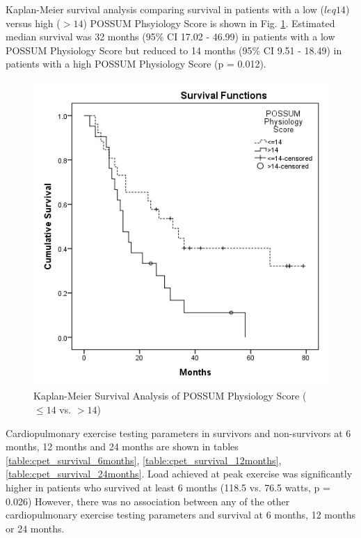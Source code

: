 Kaplan-Meier survival analysis comparing survival in patients with a low ($leq14$) versus high ($>14$) POSSUM Phsyiology Score is shown in Fig. \ref{fig:cpet_survival_km_possum}. Estimated median survival was  32 months (95\% CI 17.02 - 46.99) in patients with a low POSSUM Physiology Score but reduced to 14 months (95\% CI 9.51 - 18.49) in patients with a high POSSUM Physiology Score (p = 0.012).

\begin{figure}[htbp]
	\centering
	\includegraphics[width=0.8\linewidth]{Figures/cpet_survival_km_possum}
	\caption{Kaplan-Meier Survival Analysis of POSSUM Physiology Score ($\leq14$ vs. $>14$)}
	\label{fig:cpet_survival_km_possum}
\end{figure}

Cardiopulmonary exercise testing parameters in survivors and non-survivors at 6 months, 12 months and 24 months are shown in tables \ref{table:cpet_survival_6months}, \ref{table:cpet_survival_12months}, \ref{table:cpet_survival_24months}. Load achieved at peak exercise was significantly higher in patients who survived at least 6 months (118.5 vs. 76.5 watts, p = 0.026) However, there was no association between any of the other cardiopulmonary exercise testing parameters and survival at 6 months, 12 months or 24 months.





\clearpage

